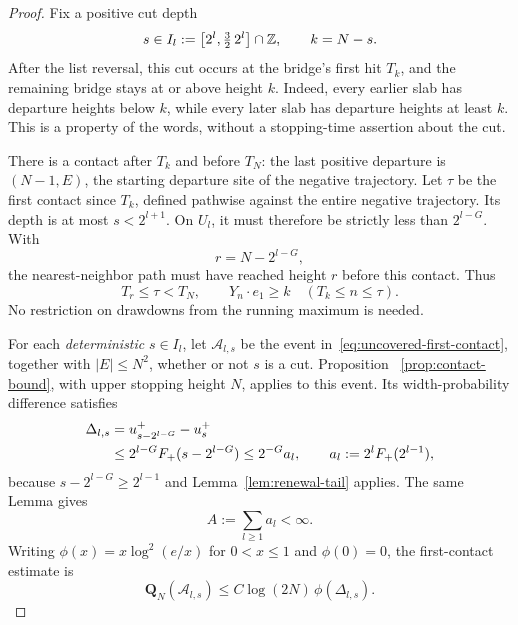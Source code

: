 \begin{proof}
Fix a positive cut depth
\[
 s\in I_l:=\bigl[2^l,\tfrac32\,2^l\bigr]\cap\mathbb Z,
 \qquad k=N-s.
\]
After the list reversal, this cut occurs at the bridge's first hit
$T_k$, and the remaining bridge stays at or above height $k$.
Indeed, every earlier slab has departure heights below $k$, while
every later slab has departure heights at least $k$.  This is a
property of the words, without a stopping-time assertion about the
cut.

There is a contact after $T_k$ and before $T_N$: the last positive
departure is $(N-1,E)$, the starting departure site of the negative
trajectory.  Let $\tau$ be the first contact since $T_k$, defined
pathwise against the entire negative trajectory.  Its depth is at
most $s<2^{l+1}$.  On $U_l$, it must therefore be strictly less than
$2^{l-G}$.  With
\[
 r=N-2^{l-G},
\]
the nearest-neighbor path must have reached height $r$ before this
contact.  Thus
\begin{equation}\label{eq:uncovered-first-contact}
 T_r\le\tau<T_N,
 \qquad Y_n\cdot e_1\ge k\quad(T_k\le n\le\tau).
\end{equation}
No restriction on drawdowns from the running maximum is needed.

For each \emph{deterministic} $s\in I_l$, let $\mathcal A_{l,s}$ be
the event in~\eqref{eq:uncovered-first-contact}, together with
$|E|\le N^2$, whether or not $s$ is a cut.  Proposition~
\ref{prop:contact-bound}, with upper stopping height $N$, applies
to this event.  Its width-probability difference satisfies
\begin{align}
 \Delta_{l,s}
 &=u^+_{s-2^{l-G}}-u^+_s\notag\\
 &\le 2^{l-G}F_+(s-2^{l-G})
 \le 2^{-G}a_l,
 \qquad a_l:=2^l F_+(2^{l-1}),
 \label{eq:lower-delta}
\end{align}
because $s-2^{l-G}\ge2^{l-1}$ and
Lemma~\ref{lem:renewal-tail} applies.  The same Lemma gives
\begin{equation}\label{eq:lower-summable-tail}
 A:=\sum_{l\ge1}a_l<\infty.
\end{equation}
Writing $\phi(x)=x\log^2(e/x)$ for $0<x\le1$ and $\phi(0)=0$,
the first-contact estimate is
\begin{equation}\label{eq:lower-fixed-cut-bound}
 \mathbf Q_N(\mathcal A_{l,s})
 \le C\log(2N)\,\phi(\Delta_{l,s}).
\end{equation}


\end{proof}
